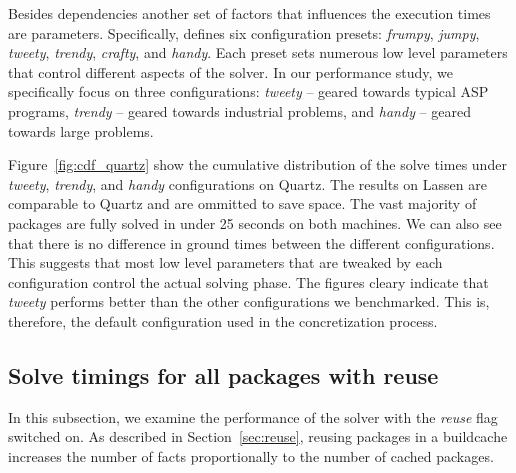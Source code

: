


% 

Besides dependencies another set of factors that influences the execution times are \clingo{} parameters. Specifically, \clingo{} defines six configuration presets: \emph{frumpy}, \emph{jumpy}, \emph{tweety}, \emph{trendy}, \emph{crafty}, and \emph{handy}. Each preset sets numerous low level parameters that control different aspects of the solver. In our performance study, we specifically focus on three configurations: \emph{tweety} -- geared towards typical ASP programs, \emph{trendy} -- geared towards industrial problems, and \emph{handy} -- geared towards large problems.

Figure~\ref{fig:cdf_quartz} show the cumulative distribution of the solve times under \emph{tweety}, \emph{trendy}, and \emph{handy} configurations on Quartz. The results on Lassen are comparable to Quartz and are ommitted to save space. The vast majority of packages are fully solved in under 25 seconds on both machines. We can also see that there is no difference in ground times between the different configurations. This suggests that most low level parameters that are tweaked by each configuration control the actual solving phase. The figures cleary indicate that \emph{tweety} performs better than the other configurations we benchmarked. This is, therefore, the default configuration used in the concretization process.


\subsection{Solve timings for all packages with reuse}

In this subsection, we examine the performance of the solver with the \emph{reuse} flag switched on. As described in Section~\ref{sec:reuse}, reusing packages in a buildcache increases the number of facts proportionally to the number of cached packages.





